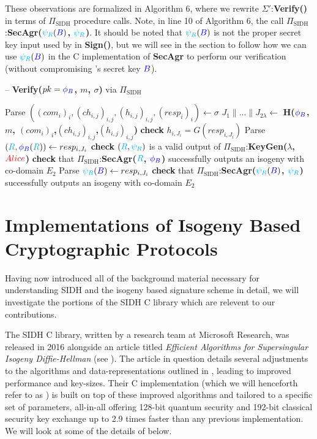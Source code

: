 These observations are formalized in Algorithm 6, where we rewrite $\Sigma'$:\textbf{Verify()} in terms of $\Pi_{\text{SIDH}}$ procedure calls. Note, in line 10 of Algorithm 6, the call $\Pi_{\text{SIDH}}$:\textbf{SecAgr($\textcolor{cyan}{\psi_R}(\textcolor{blue}{B})$, $\textcolor{cyan}{\psi_R}$)}. It should be noted that $\textcolor{cyan}{\psi_R}(\textcolor{blue}{B})$ is not the proper secret key input used by \bob in \textbf{Sign()}, but we will see in the section to follow how we can use $\textcolor{cyan}{\psi_R}(\textcolor{blue}{B})$ in the C implementation of \textbf{SecAgr} to perform our verification (without compromising \bob's secret key $\textcolor{blue}{B}$).

\begin{algorithm}[H]
\caption{-- \textbf{Verify($pk = \textcolor{blue}{\phi_B}$, $m$, $\sigma$)} via $\Pi_{\text{SIDH}}$}\label{euclid}
\begin{algorithmic}[1]
\State Parse $((com_i)_i, (ch_{i,j})_{i,j}, (h_{i,j})_{i,j}, (resp_{i})_{i}) \gets \sigma$
\State $J_{1} \parallel ... \parallel J_{2\lambda} \gets$ \textbf{H($\textcolor{blue}{\phi_B}$, $m$, $(com_{i})_{i}$,$(ch_{i,j})_{i,j}$,$(h_{i,j})_{i,j}$)}
	\State \textbf{check} $h_{i,J_{i}} = G(resp_{i,J_{i}})$
		\State Parse $(\textcolor{cyan}{R},\textcolor{blue}{\phi_B}(\textcolor{cyan}{R})) \gets resp_{i,J_{i}}$
		\State \textbf{check} $(\textcolor{cyan}{R}, \textcolor{cyan}{\psi_R})$ is a valid output of $\Pi_{\text{SIDH}}$:\textbf{KeyGen($\lambda$, $\textcolor{red}{Alice}$)}
		\State \textbf{check} that $\Pi_{\text{SIDH}}$:\textbf{SecAgr($\textcolor{cyan}{R}$, $\textcolor{blue}{\phi_B}$)} successfully outputs an isogeny with co-domain $E_{2}$
	\Else
		\State Parse $\textcolor{cyan}{\psi_R}(\textcolor{blue}{B}) \gets resp_{i,J_{i}}$
		\State \textbf{check} that $\Pi_{\text{SIDH}}$:\textbf{SecAgr($\textcolor{cyan}{\psi_R}(\textcolor{blue}{B})$, $\textcolor{cyan}{\psi_R}$)} successfully outputs an isogeny with co-domain $E_{2}$
	\EndIf
\EndFor

	\State {}
\Else
	\State {}
\EndIf
\end{algorithmic}
\end{algorithm}

\section{Implementations of Isogeny Based Cryptographic Protocols}
\label{sec:implementations}

Having now introduced all of the background material necessary for understanding SIDH and the isogeny based signature scheme in detail, we will investigate the portions of the SIDH C library which are relevent to our contributions.

The SIDH C library, written by a research team at Microsoft Research, was released in 2016 alongside an article titled \emph{Efficient Algorithms for Supersingular Isogeny Diffie-Hellman} (see \cite{effalg}). The article in question details several adjustments to the algorithms and data-representations outlined in \cite{djp}, leading to improved performance and key-sizes. Their C implementation (which we will henceforth refer to as \sidh) is built on top of these improved algorithms and tailored to a specific set of parameters, all-in-all offering 128-bit quantum security and 192-bit classical security key exchange up to 2.9 times faster than any previous implementation. We will look at some of the details of \sidh below. 

